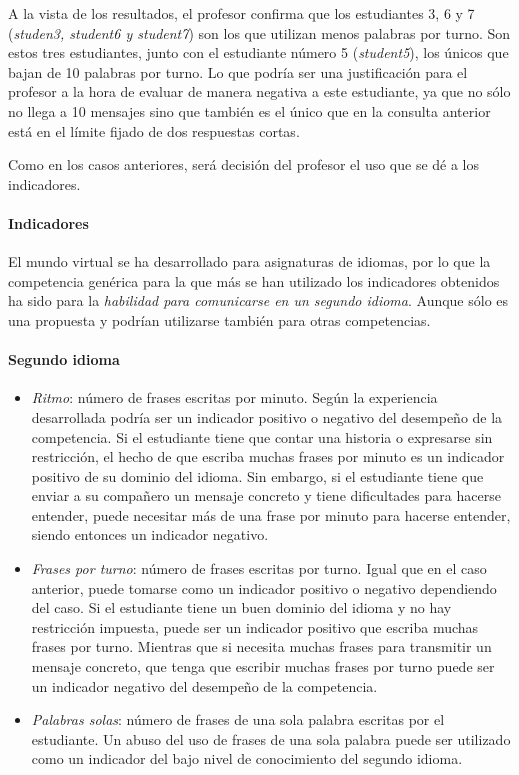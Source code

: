A la vista de los resultados, el profesor confirma que los estudiantes 3, 6 y 7 (\emph{studen3, student6 y student7}) son los que utilizan menos palabras por turno. Son estos tres estudiantes, junto con el estudiante número 5 (\emph{student5}), los únicos que bajan de 10 palabras por turno. Lo que podría ser una justificación para el profesor a la hora de evaluar de manera negativa a este estudiante, ya que no sólo no llega a 10 mensajes sino que también es el único que en la consulta anterior está en el límite fijado de dos respuestas cortas.

Como en los casos anteriores, será decisión del profesor el uso que se dé a los indicadores.

\paragraph{Indicadores}

El mundo virtual se ha desarrollado para asignaturas de idiomas, por lo que la competencia genérica para la que más se han utilizado los indicadores obtenidos ha sido para la \emph{habilidad para comunicarse en un segundo idioma}. Aunque sólo es una propuesta y podrían utilizarse también para otras competencias.


\paragraph*{Segundo idioma}
\begin{itemize}
\item \emph{Ritmo}: número de frases escritas por minuto. Según la experiencia desarrollada podría ser un indicador positivo o negativo del desempeño de la competencia. Si el estudiante tiene que contar una historia o expresarse sin restricción, el hecho de que escriba muchas frases por minuto es un indicador positivo de su dominio del idioma. Sin embargo, si el estudiante tiene que enviar a su compañero un mensaje concreto y tiene dificultades  para hacerse entender, puede necesitar más de una frase por minuto para hacerse entender, siendo entonces un indicador negativo.
\item \emph{Frases por turno}: número de frases escritas por turno. Igual que en el caso anterior, puede tomarse como un indicador positivo o negativo dependiendo del caso. Si el estudiante tiene un buen dominio del idioma y no hay restricción impuesta, puede ser un indicador positivo que escriba muchas frases por turno. Mientras que si necesita muchas frases para transmitir un mensaje concreto, que tenga que escribir muchas frases por turno puede ser un indicador negativo del desempeño de la competencia.
\item \emph{Palabras solas}: número de frases de una sola palabra escritas por el estudiante. Un abuso del uso de frases de una sola palabra puede ser utilizado como un indicador del bajo nivel de conocimiento del segundo idioma.
\end{itemize}


